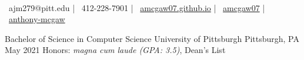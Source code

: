 \documentclass[]{awesome-cv}
\begin{document}
    
\begin{center}
	  \\
	\vspace{2mm}
    	{\faEnvelope\ ajm279@pitt.edu} | {\faMobile\ 412-228-7901} | {\faHome\ \href{https://amcgaw07.github.io/}{amcgaw07.github.io}} | {\faGithub\ \href{https://github.com/amcgaw07}{amcgaw07}} | {\faLinkedin\ \href{https://www.linkedin.com/in/anthony-mcgaw}{anthony-mcgaw}}
\end{center}
\vspace{5mm}
\begin{cventries}
	\cventry
	{Bachelor of Science in Computer Science}
	{University of Pittsburgh}
	{Pittsburgh, PA}
	{May 2021}
	{Honors: \textit{magna cum laude (GPA: 3.5)}, Dean's List}
	
	
\end{cventries}
\end{document}
